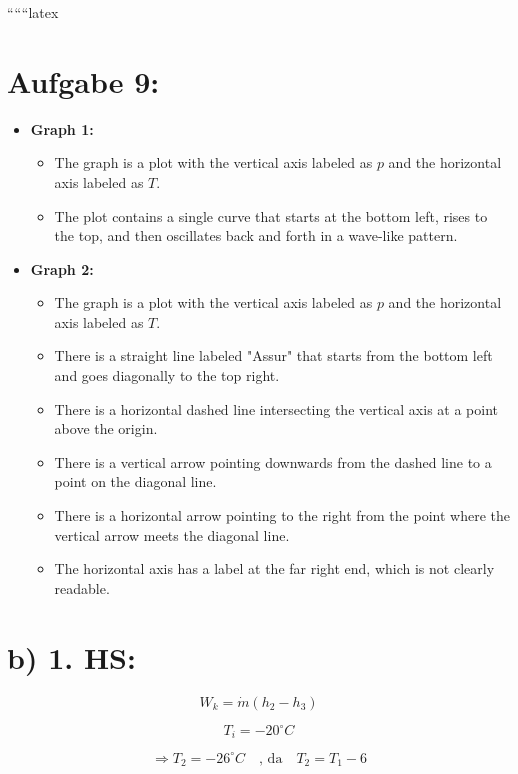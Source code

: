 
``````latex


\section*{Aufgabe 9:}

\begin{itemize}
    \item \textbf{Graph 1:} 
    \begin{itemize}
        \item The graph is a plot with the vertical axis labeled as \( p \) and the horizontal axis labeled as \( T \).
        \item The plot contains a single curve that starts at the bottom left, rises to the top, and then oscillates back and forth in a wave-like pattern.
    \end{itemize}
    
    \item \textbf{Graph 2:}
    \begin{itemize}
        \item The graph is a plot with the vertical axis labeled as \( p \) and the horizontal axis labeled as \( T \).
        \item There is a straight line labeled "Assur" that starts from the bottom left and goes diagonally to the top right.
        \item There is a horizontal dashed line intersecting the vertical axis at a point above the origin.
        \item There is a vertical arrow pointing downwards from the dashed line to a point on the diagonal line.
        \item There is a horizontal arrow pointing to the right from the point where the vertical arrow meets the diagonal line.
        \item The horizontal axis has a label at the far right end, which is not clearly readable.
    \end{itemize}
\end{itemize}

\section*{b) 1. HS:}

\[
W_k = \dot{m} (h_2 - h_3)
\]

\[
T_i = -20^\circ C
\]

\[
\Rightarrow T_2 = -26^\circ C \quad \text{, da} \quad T_2 = T_1 - 6
\]

